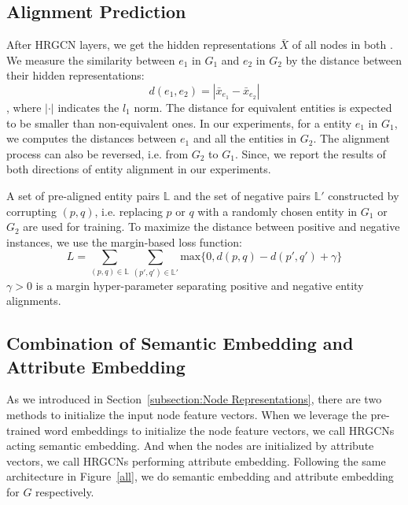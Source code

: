 	\subsection{Alignment Prediction}
	After HRGCN layers, we get the hidden representations $\bar{X}$ of all nodes in both \KGs. We measure the similarity between $e_1$ in $G_1$ and $e_2$ in $G_2$ by the distance between their hidden representations:
	\begin{equation}
	\label{d}
	d(e_1,e_2)=|\bar{x}_{e_1}-\bar{x}_{e_2}|
	\end{equation}
	, where $|\cdot|$ indicates the $l_1$ norm. The distance for equivalent entities is expected to be smaller than non-equivalent ones. In our experiments, for a entity $e_1$ in $G_1$, we computes the distances between $e_1$ and all the entities in $G_2$. The alignment process can also be reversed, i.e. from $G_2$ to $G_1$. Since, we report the results of both directions of entity alignment in our experiments.
	
	A set of pre-aligned entity pairs $\mathbb{L}$ and the set of negative pairs $\mathbb{L'}$  constructed by corrupting $(p, q)$, i.e. replacing $p$ or $q$ with a randomly chosen entity in $G_1$ or $G_2$ are used for training. To maximize the distance between positive and negative instances, we use the margin-based loss function:
	\begin{equation}
	L=\sum\limits_{(p,q)\in \mathbb{L}}\sum\limits_{(p',q')\in \mathbb{L'}}\mathrm{max}\{0,d(p,q)-d(p',q')+\gamma\}
	\end{equation}
	$\gamma > 0$ is a margin hyper-parameter separating positive and negative entity alignments.
	
	\subsection{Combination of Semantic Embedding and Attribute Embedding}
	As we introduced in Section~\ref{subsection:Node Representations}, there are two methods to initialize the input node feature vectors.
	When we leverage the pre-trained word embeddings to initialize the node feature vectors, we call HRGCNs acting semantic embedding.
	And when the nodes are initialized by attribute vectors, we call HRGCNs performing attribute embedding.
	Following the same architecture in Figure~\ref{all}, we do semantic embedding and attribute embedding for $G$ respectively.
	
